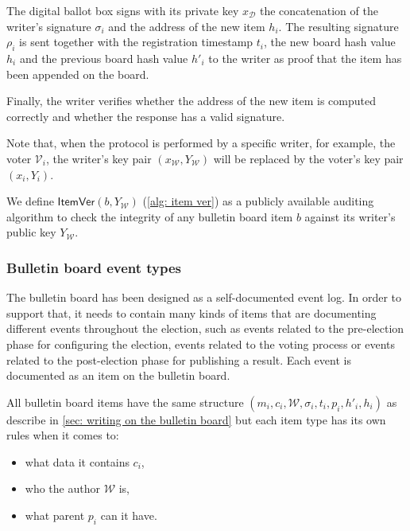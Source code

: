 The digital ballot box signs with its private key $x_\mathcal{D}$ the concatenation of the writer's signature $\sigma_i$ and the address of the new item $h_i$. The resulting signature $\rho_i$ is sent together with the registration timestamp $t_i$, the new board hash value $h_i$ and the previous board hash value $h'_i$ to the writer as proof that the item has been appended on the board.

Finally, the writer verifies whether the address of the new item is computed correctly and whether the response has a valid signature.

Note that, when the protocol is performed by a specific writer, for example, the voter $\mathcal{V}_i$, the writer's key pair $(x_\mathcal{W}, Y_\mathcal{W})$ will be replaced by the voter's key pair $(x_i, Y_i)$.

We define $\mathsf{ItemVer}(b, Y_\mathcal{W})$ (\cref{alg: item ver}) as a publicly available auditing algorithm to check the integrity of any bulletin board item $b$ against its writer's public key $Y_\mathcal{W}$.

\begin{algorithm}[ht]
    \DontPrintSemicolon
    \caption{$\mathsf{ItemVer}(b, Y_\mathcal{W})$}
    \label{alg: item ver}

\end{algorithm}


\subsubsection{Bulletin board event types} \label{sec: bulletin board event types}
The bulletin board has been designed as a self-documented event log. In order to support that, it needs to contain many kinds of items that are documenting different events throughout the election, such as events related to the pre-election phase for configuring the election, events related to the voting process or events related to the post-election phase for publishing a result. Each event is documented as an item on the bulletin board.

All bulletin board items have the same structure $(m_i, c_i, \mathcal{W}, \sigma_i, t_i, p_i, h'_i, h_i)$ as describe in \cref{sec: writing on the bulletin board} but each item type has its own rules when it comes to:
\begin{itemize}
    \item what data it contains $c_i$,
    \item who the author $\mathcal{W}$ is,
    \item what parent $p_i$ can it have.
\end{itemize}

